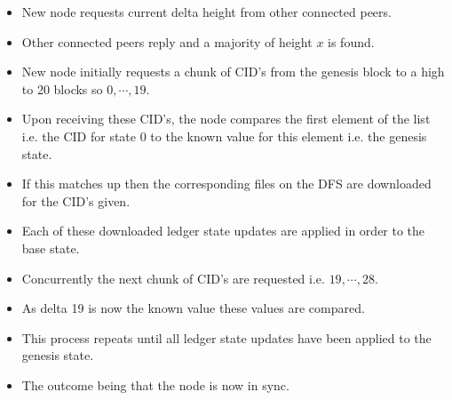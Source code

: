 \begin{itemize} 

\item New node requests current delta height from other connected peers. 
\item Other connected peers reply and a majority of height $x$ is found. 
\item New node initially requests a chunk of CID's from the genesis block to a high to 20 blocks so $0,\cdots,19$.
\item Upon receiving these CID's, the node compares the first element of the list i.e. the CID for state 0 to the known value for this element i.e. the genesis state. 
\item If this matches up then the corresponding files on the DFS are downloaded for the CID's given. 
\item Each of these downloaded ledger state updates are applied in order to the base state. 
\item Concurrently the next chunk of CID's are requested i.e.  $19,\cdots,28$.
\item As delta 19 is now the known value these values are compared. 
\item This process repeats until all ledger state updates have been applied to the genesis state. 
\item The outcome being that the node is now in sync. 

\end{itemize} 


